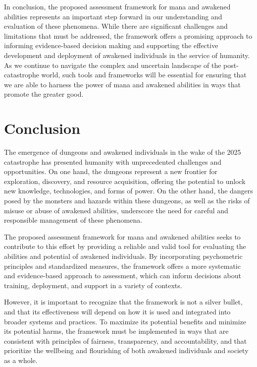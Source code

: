 \documentclass[12pt, a4paper]{article}
\begin{document}
In conclusion, the proposed assessment framework for mana and awakened abilities represents an important step forward in our understanding and evaluation of these phenomena. While there are significant challenges and limitations that must be addressed, the framework offers a promising approach to informing evidence-based decision making and supporting the effective development and deployment of awakened individuals in the service of humanity. As we continue to navigate the complex and uncertain landscape of the post-catastrophe world, such tools and frameworks will be essential for ensuring that we are able to harness the power of mana and awakened abilities in ways that promote the greater good.

\section{Conclusion}

The emergence of dungeons and awakened individuals in the wake of the 2025 catastrophe has presented humanity with unprecedented challenges and opportunities. On one hand, the dungeons represent a new frontier for exploration, discovery, and resource acquisition, offering the potential to unlock new knowledge, technologies, and forms of power. On the other hand, the dangers posed by the monsters and hazards within these dungeons, as well as the risks of misuse or abuse of awakened abilities, underscore the need for careful and responsible management of these phenomena.

The proposed assessment framework for mana and awakened abilities seeks to contribute to this effort by providing a reliable and valid tool for evaluating the abilities and potential of awakened individuals. By incorporating psychometric principles and standardized measures, the framework offers a more systematic and evidence-based approach to assessment, which can inform decisions about training, deployment, and support in a variety of contexts.

However, it is important to recognize that the framework is not a silver bullet, and that its effectiveness will depend on how it is used and integrated into broader systems and practices. To maximize its potential benefits and minimize its potential harms, the framework must be implemented in ways that are consistent with principles of fairness, transparency, and accountability, and that prioritize the wellbeing and flourishing of both awakened individuals and society as a whole.
\end{document}
